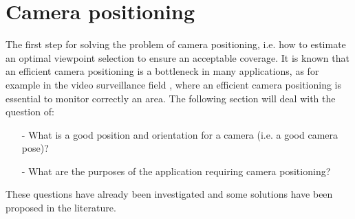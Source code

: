 
\section{Camera positioning }\label{sec:camerasPositioning}

The first step for solving the problem of camera positioning, i.e. how to estimate an optimal viewpoint selection to ensure an acceptable coverage. It is known that an efficient camera positioning is a bottleneck in many applications, as for example in the video surveillance field \cite{11*herrera2012,12*soto2009,18*ding2012,151*zhao2013,84*xu2011}, where an efficient camera positioning is essential to monitor correctly an area.  
The following section will deal with the question of: 
\begin{itemize}
\item[-]What is a good position and orientation for a camera (i.e. a good camera pose)?
\item[-]What are the purposes of the application requiring camera positioning?

\end{itemize}
These questions have already been investigated and some solutions have been proposed in the literature. 


